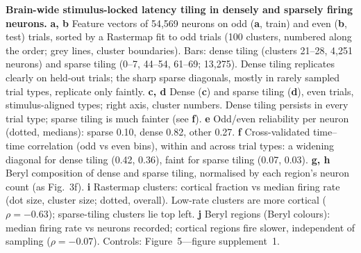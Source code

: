 \caption{\textbf{Brain-wide stimulus-locked latency tiling in densely and sparsely firing neurons.}
\textbf{a, b} Feature vectors of 54,569 neurons on odd (\textbf{a}, train) and even (\textbf{b}, test) trials, sorted by a Rastermap fit to odd trials (100 clusters, numbered along the order; grey lines, cluster boundaries). Bars: dense tiling (clusters 21--28, 4,251 neurons) and sparse tiling (0--7, 44--54, 61--69; 13,275). Dense tiling replicates clearly on held-out trials; the sharp sparse diagonals, mostly in rarely sampled trial types, replicate only faintly.
\textbf{c, d} Dense (\textbf{c}) and sparse tiling (\textbf{d}), even trials, stimulus-aligned types; right axis, cluster numbers. Dense tiling persists in every trial type; sparse tiling is much fainter (see \textbf{f}).
\textbf{e} Odd/even reliability per neuron (dotted, medians): sparse 0.10, dense 0.82, other 0.27.
\textbf{f} Cross-validated time--time correlation (odd vs even bins), within and across trial types: a widening diagonal for dense tiling (0.42, 0.36), faint for sparse tiling (0.07, 0.03).
\textbf{g, h} Beryl composition of dense and sparse tiling, normalised by each region's neuron count (as Fig.~3f).
\textbf{i} Rastermap clusters: cortical fraction vs median firing rate (dot size, cluster size; dotted, overall). Low-rate clusters are more cortical ($\rho=-0.63$); sparse-tiling clusters lie top left.
\textbf{j} Beryl regions (Beryl colours): median firing rate vs neurons recorded; cortical regions fire slower, independent of sampling ($\rho=-0.07$).
Controls: Figure~5---figure supplement~1.}
\label{fig:latency_tiling}
